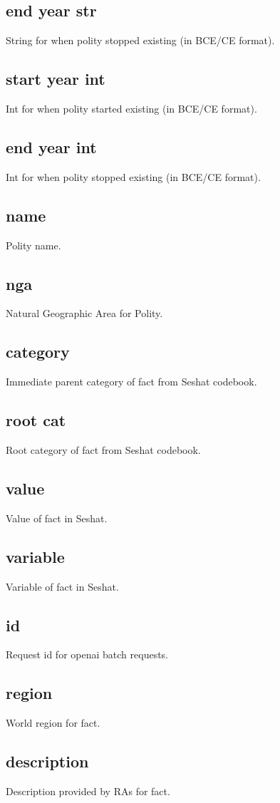 \documentclass[11pt]{article}
\begin{document}
\subsection*{end year str}
\label{sec:org4e5e441}
String for when polity stopped existing (in BCE/CE format).
\subsection*{start year int}
\label{sec:orgf83c4d6}
Int for when polity started existing (in BCE/CE format).
\subsection*{end year int}
\label{sec:org37fd5a7}
Int for when polity stopped existing (in BCE/CE format).
\subsection*{name}
\label{sec:orgc56ecae}
Polity name.
\subsection*{nga}
\label{sec:orgb1ede12}
Natural Geographic Area for Polity.
\subsection*{category}
\label{sec:org469c9a3}
Immediate parent category of fact from Seshat codebook.
\subsection*{root cat}
\label{sec:org07cb03c}
Root category of fact from Seshat codebook.
\subsection*{value}
\label{sec:org5cbf905}
Value of fact in Seshat.
\subsection*{variable}
\label{sec:org0ce31a9}
Variable of fact in Seshat.
\subsection*{id}
\label{sec:org764cce0}
Request id for openai batch requests.
\subsection*{region}
\label{sec:orgdbf6452}
World region for fact.
\subsection*{description}
\label{sec:orgbc0e2ae}
Description provided by RAs for fact.
\end{document}
